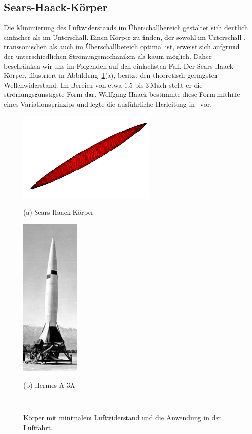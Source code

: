 \subsection{Sears-Haack-Körper}
Die Minimierung des Luftwiderstands im Überschallbereich 
gestaltet sich deutlich einfacher als im Unterschall. 
Einen Körper zu finden, der sowohl im Unterschall-, 
transsonischen als auch im Überschallbereich optimal ist, 
erweist sich aufgrund der unterschiedlichen 
Strömungsmechaniken als kaum möglich.
Daher beschränken wir uns im Folgenden auf den einfachsten Fall.
Der Sears-Haack-Körper, illustriert in Abbildung~\ref{fig:sears_haack}(a), 
%
besitzt den theoretisch geringsten Wellenwiderstand. 
Im Bereich von etwa $1.5$ bis $3\,\mathrm{Mach}$ 
stellt er die strömungsgünstigste Form dar. 
Wolfgang Haack bestimmte diese Form mithilfe eines 
%
Variationsprinzips und legte die ausführliche Herleitung 
in~\cite{Haack1941} vor.
\begin{figure}
    \centering
    \begin{minipage}[t]{0.48\textwidth}
       \centering
        \includegraphics[height=4.5cm]{papers/ueberschall/figures/Sears-Haack.png}
        \caption*{(a) Sears-Haack-Körper~\cite{SearsHaackWikipedia}}
    \end{minipage}
    \hfill
    \begin{minipage}[t]{0.48\textwidth}
        \centering
        \includegraphics[height=8cm]{papers/ueberschall/figures/hermes-a3a.jpg}
        \caption*{(b) Hermes A-3A~\cite{WeebauHermesA3A}}
    \end{minipage}
    \caption{Körper mit minimalem Luftwiderstand und die Anwendung in der Luftfahrt.}
    ~\label{fig:sears_haack}
\end{figure}
